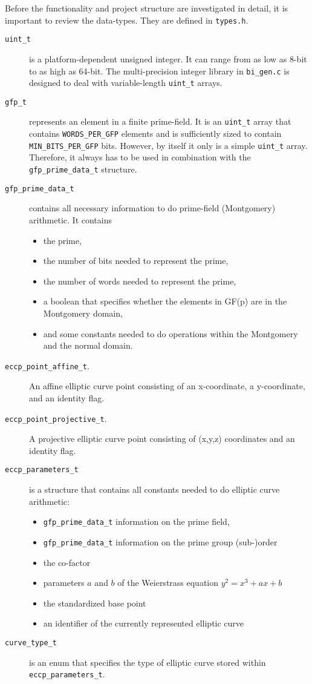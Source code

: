 \documentclass[runningheads]{llncs}
\begin{document}
Before the functionality and project structure are investigated in detail, it is important to review the data-types. They are defined in \texttt{types.h}.

\begin{description}
\item[\texttt{uint\_t}] is a platform-dependent unsigned integer. It can range from as low as 8-bit to as high as 64-bit. The multi-precision integer library in \texttt{bi\_gen.c} is designed to deal with variable-length \texttt{uint\_t} arrays.
\item[\texttt{gfp\_t}] represents an element in a finite prime-field. It is an \texttt{uint\_t} array that contains \texttt{WORDS\_PER\_GFP} elements and is sufficiently sized to contain \texttt{MIN\_BITS\_PER\_GFP} bits. However, by itself it only is a simple \texttt{uint\_t} array. Therefore, it always has to be used in combination with the \texttt{gfp\_prime\_data\_t} structure. 
\item[\texttt{gfp\_prime\_data\_t}] contains all necessary information to do prime-field (Montgomery) arithmetic. It contains
  \begin{itemize}
  \item the prime,
  \item the number of bits needed to represent the prime,
  \item the number of words needed to represent the prime,
  \item a boolean that specifies whether the elements in GF(p) are in the Montgomery domain,
  \item and some constants needed to do operations within the Montgomery and the normal domain. 
  \end{itemize}
\item[\texttt{eccp\_point\_affine\_t}.] An affine elliptic curve point consisting of an x-coordinate, a y-coordinate, and an identity flag.
\item[\texttt{eccp\_point\_projective\_t}.] A projective elliptic curve point consisting of (x,y,z) coordinates and an identity flag.
\item[\texttt{eccp\_parameters\_t}] is a structure that contains all constants needed to do elliptic curve arithmetic:
  \begin{itemize}
  \item \texttt{gfp\_prime\_data\_t} information on the prime field,
  \item \texttt{gfp\_prime\_data\_t} information on the prime group (sub-)order 
  \item the co-factor
  \item parameters $a$ and $b$ of the Weierstrass equation $y^2=x^3+ax+b$
  \item the standardized base point
  \item an identifier of the currently represented elliptic curve
  \end{itemize}
\item[\texttt{curve\_type\_t}] is an enum that specifies the type of elliptic curve stored within \texttt{eccp\_parameters\_t}. 
\end{description}
\end{document}
